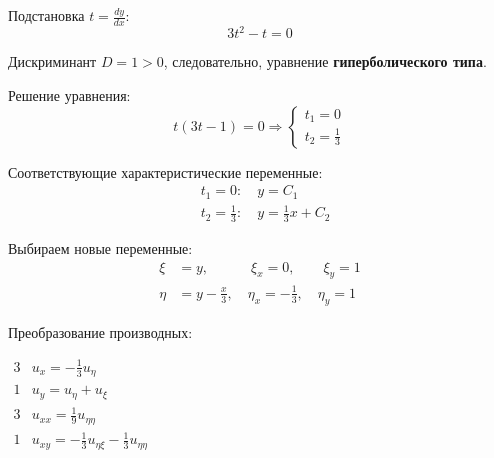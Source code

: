 \documentclass[a4paper,12pt]{article}
\begin{document}
Подстановка $t = \frac{dy}{dx}$:
\begin{equation*}
    3t^2 - t = 0 
\end{equation*}

Дискриминант $D = 1 > 0$, следовательно, уравнение \textbf{гиперболического типа}.

Решение уравнения:
\begin{equation*}
    t(3t - 1) = 0 \Rightarrow 
    \begin{cases}
    t_1 = 0 \\
    t_2 = \frac{1}{3}
    \end{cases}
\end{equation*}

Соответствующие характеристические переменные:
\begin{align*}
    &t_1 = 0: \quad y = C_1 \\
    &t_2 = \frac{1}{3}: \quad y = \frac{1}{3} x + C_2
\end{align*}

Выбираем новые переменные:
\begin{align*}
    \xi &= y, \quad \quad \quad \xi_x = 0,  \quad \quad \xi_y = 1 \\
    \eta &= y - \frac{x}{3}, \quad \eta_x = -\frac{1}{3},  \quad \eta_y = 1
\end{align*}

Преобразование производных:
\begin{flushleft}
\(
\begin{array}{r|l}
3 & u_x = -\frac{1}{3} u_{\eta} \\
1 & u_y = u_{\eta} + u_{\xi} \\
3 & u_{xx} = \frac{1}{9} u_{\eta\eta} \\
1 & u_{xy} = -\frac{1}{3} u_{\eta\xi} - \frac{1}{3} u_{\eta\eta}
\end{array}
\)
\end{flushleft}
\end{document}
